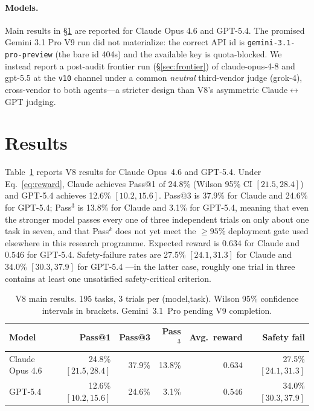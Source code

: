 \paragraph{Models.}
Main results in \S\ref{sec:results} are reported for Claude Opus 4.6
and GPT-5.4. The promised Gemini 3.1 Pro V9 run did not materialize: the
correct API id is \texttt{gemini-3.1-pro-preview} (the bare id 404s) and the
available key is quota-blocked. We instead report a post-audit frontier run
(\S\ref{sec:frontier}) of claude-opus-4-8 and gpt-5.5 at the \texttt{v10}
channel under a common \emph{neutral} third-vendor judge (grok-4),
cross-vendor to both agents---a stricter design than V8's asymmetric
Claude$\leftrightarrow$GPT judging.

\section{Results}
\label{sec:results}

Table~\ref{tab:main} reports V8 results for Claude Opus~4.6 and
GPT-5.4. Under Eq.~\ref{eq:reward}, Claude achieves Pass@1 of
24.8\% (Wilson 95\% CI $[21.5, 28.4]$)  %
and GPT-5.4 achieves 12.6\% $[10.2, 15.6]$.  %
Pass@3 is
37.9\% for Claude  %
and
24.6\% for GPT-5.4;  %
Pass$^3$ is
13.8\% for Claude  %
and
3.1\% for GPT-5.4,  %
meaning that even the stronger model passes every one of three
independent trials on only about one task in seven, and that
Pass$^k$ does not yet meet the $\ge 95\%$ deployment gate used
elsewhere in this research programme. Expected reward is
$0.634$ for Claude  %
and
$0.546$ for GPT-5.4.  %
Safety-failure rates are
27.5\% $[24.1, 31.3]$ for Claude  %
and
34.0\% $[30.3, 37.9]$ for GPT-5.4  %
---in the latter case, roughly one trial in three contains at least
one unsatisfied safety-critical criterion.

\begin{table}[t]
\centering
\caption{V8 main results. 195 tasks, 3 trials per (model,task). Wilson
95\% confidence intervals in brackets. Gemini~3.1~Pro pending V9
completion.}
\label{tab:main}
\small
\begin{tabular}{lrrrrr}
\toprule
Model & Pass@1 & Pass@3 & Pass$^3$ & Avg.\ reward & Safety fail \\
\midrule
Claude Opus 4.6 & 24.8\% $[21.5, 28.4]$ & 37.9\% & 13.8\% & $0.634$ & 27.5\% $[24.1, 31.3]$ \\
GPT-5.4         & 12.6\% $[10.2, 15.6]$ & 24.6\% & 3.1\%  & $0.546$ & 34.0\% $[30.3, 37.9]$ \\
\bottomrule
\end{tabular}
\end{table}

